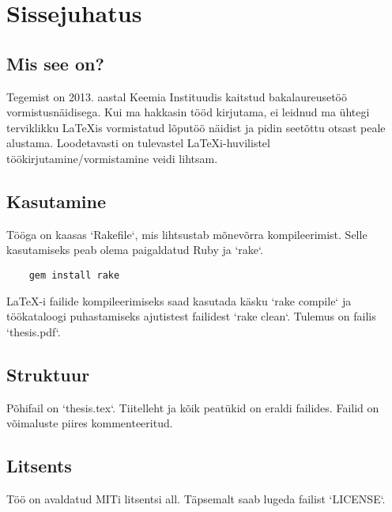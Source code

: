%
%
%

\section{Sissejuhatus}

\subsection{Mis see on?}

Tegemist on 2013. aastal Keemia Instituudis kaitstud bakalaureusetöö vormistusnäidisega.
Kui ma hakkasin tööd kirjutama, ei leidnud ma ühtegi terviklikku LaTeXis vormistatud lõputöö näidist ja pidin seetõttu otsast peale alustama.
Loodetavasti on tulevastel LaTeXi-huvilistel töökirjutamine/vormistamine veidi lihtsam.

\subsection{Kasutamine}
Tööga on kaasas `Rakefile`, mis lihtsustab mõnevõrra kompileerimist.
Selle kasutamiseks peab olema paigaldatud Ruby ja `rake`.

\begin{verbatim}
    gem install rake
\end{verbatim}

\LaTeX-i failide kompileerimiseks saad kasutada käsku `rake compile` ja 
töökataloogi puhastamiseks ajutistest failidest `rake clean`.
Tulemus on failis `thesis.pdf`.

\subsection{Struktuur}

Põhifail on `thesis.tex`.
Tiitelleht ja kõik peatükid on eraldi failides.
Failid on võimaluste piires kommenteeritud.

\subsection{Litsents}

Töö on avaldatud MITi litsentsi all.
Täpsemalt saab lugeda failist `LICENSE`.
